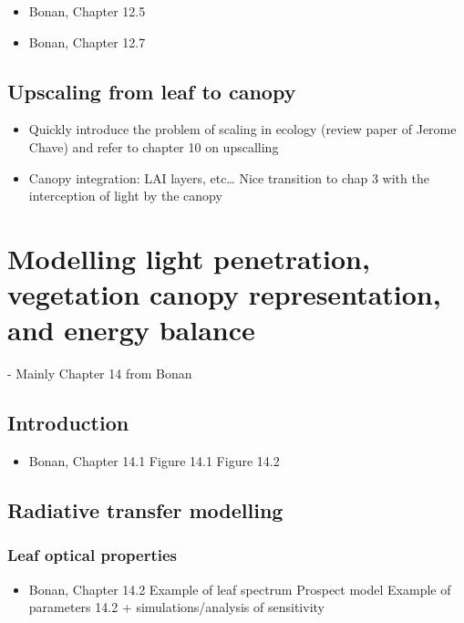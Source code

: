 \documentclass[oneside]{book}
\providecommand{\tightlist}{%
  \setlength{\itemsep}{0pt}\setlength{\parskip}{0pt}}
\begin{document}
\begin{itemize}
\tightlist
\item
  Bonan, Chapter 12.5
\item
  Bonan, Chapter 12.7
\end{itemize}

\section{Upscaling from leaf to
canopy}\label{upscaling-from-leaf-to-canopy}

\begin{itemize}
\tightlist
\item
  Quickly introduce the problem of scaling in ecology (review paper of
  Jerome Chave) and refer to chapter 10 on upscalling
\item
  Canopy integration: LAI layers, etc\ldots{} Nice transition to chap 3
  with the interception of light by the canopy
\end{itemize}

\chapter{Modelling light penetration, vegetation canopy representation,
and energy
balance}\label{modelling-light-penetration-vegetation-canopy-representation-and-energy-balance}

 - Mainly Chapter 14 from Bonan

\section{Introduction}\label{introduction}

\begin{itemize}
\tightlist
\item
  Bonan, Chapter 14.1 Figure 14.1 Figure 14.2
\end{itemize}

\section{Radiative transfer
modelling}\label{radiative-transfer-modelling}

\subsection{Leaf optical properties}\label{leaf-optical-properties}

\begin{itemize}
\tightlist
\item
  Bonan, Chapter 14.2 Example of leaf spectrum Prospect model Example of
  parameters 14.2 + simulations/analysis of sensitivity
\end{itemize}
\end{document}
